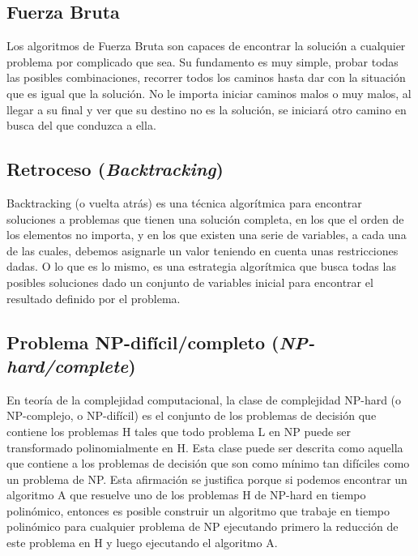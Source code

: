 \subsection{Fuerza Bruta}
Los algoritmos de Fuerza Bruta son capaces de encontrar la solución a cualquier problema por complicado que sea. Su fundamento es muy simple, probar todas las posibles combinaciones, recorrer todos los caminos hasta dar con la situación que es igual que la solución. No le importa iniciar caminos malos o muy malos, al llegar a su final y ver que su destino no es la solución, se iniciará otro camino en busca del que conduzca a ella.

\subsection{Retroceso (\emph{Backtracking})}
Backtracking (o vuelta atrás) es una técnica algorítmica para encontrar soluciones a problemas que tienen una solución completa, en los que el orden de los elementos no importa, y en los que existen una serie de variables, a cada una de las cuales, debemos asignarle un valor teniendo en cuenta unas restricciones dadas.
O lo que es lo mismo, es una estrategia algorítmica que busca todas las posibles soluciones dado un conjunto de variables inicial para encontrar el resultado definido por el problema.

\subsection{Problema NP-difícil/completo (\emph{NP-hard/complete})}

En teoría de la complejidad computacional, la clase de complejidad NP-hard (o NP-complejo, o NP-difícil) es el conjunto de los problemas de decisión que contiene los problemas H tales que todo problema L en NP puede ser transformado polinomialmente en H. Esta clase puede ser descrita como aquella que contiene a los problemas de decisión que son como mínimo tan difíciles como un problema de NP. Esta afirmación se justifica porque si podemos encontrar un algoritmo A que resuelve uno de los problemas H de NP-hard en tiempo polinómico, entonces es posible construir un algoritmo que trabaje en tiempo polinómico para cualquier problema de NP ejecutando primero la reducción de este problema en H y luego ejecutando el algoritmo A. 